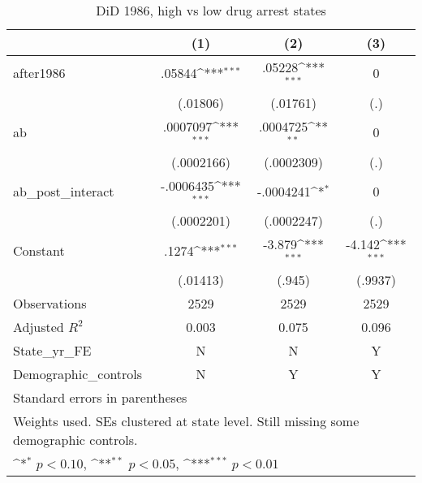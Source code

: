 \begin{table}[htbp]\centering
\def\sym#1{\ifmmode^{#1}\else\(^{#1}\)\fi}
\caption{DiD 1986, high vs low drug arrest states}
\begin{tabular}{l*{3}{c}}
\hline\hline
                    &\multicolumn{1}{c}{(1)}         &\multicolumn{1}{c}{(2)}         &\multicolumn{1}{c}{(3)}         \\
\hline
after1986           &      .05844\sym{***}&      .05228\sym{***}&           0         \\
                    &    (.01806)         &    (.01761)         &         (.)         \\
[1em]
ab                  &    .0007097\sym{***}&    .0004725\sym{**} &           0         \\
                    &  (.0002166)         &  (.0002309)         &         (.)         \\
[1em]
ab\_post\_interact    &   -.0006435\sym{***}&   -.0004241\sym{*}  &           0         \\
                    &  (.0002201)         &  (.0002247)         &         (.)         \\
[1em]
Constant            &       .1274\sym{***}&      -3.879\sym{***}&      -4.142\sym{***}\\
                    &    (.01413)         &      (.945)         &     (.9937)         \\
\hline
Observations        &        2529         &        2529         &        2529         \\
Adjusted \(R^{2}\)  &       0.003         &       0.075         &       0.096         \\
State\_yr\_FE         &           N         &           N         &           Y         \\
Demographic\_controls&           N         &           Y         &           Y         \\
\hline\hline
\multicolumn{4}{l}{\footnotesize Standard errors in parentheses}\\
\multicolumn{4}{l}{\footnotesize Weights used. SEs clustered at state level. Still missing some demographic controls.}\\
\multicolumn{4}{l}{\footnotesize \sym{*} \(p<0.10\), \sym{**} \(p<0.05\), \sym{***} \(p<0.01\)}\\
\end{tabular}
\end{table}
